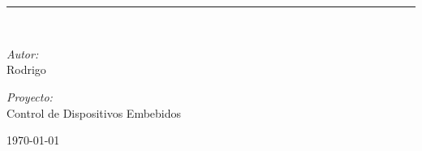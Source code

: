 \documentclass[
10pt, %
a4paper, %
oneside, %
headinclude,footinclude, %
BCOR5mm, %
]{scrartcl}
\begin{document}
\begin{titlepage}
	\centering
	\vspace*{2cm}
	
	
	\vspace{1cm}
	
	{\Huge\bfseries\color{Maroon}}\\[0.5cm]
	
	{\Large{}}\\[1.5cm]
	
	\rule{\linewidth}{1pt}\\[2cm]
	
	\begin{minipage}{0.45\textwidth}
		\begin{flushleft} \large
			\emph{Autor:}\\
			Rodrigo 
		\end{flushleft}
	\end{minipage}
	\hfill
	\begin{minipage}{0.45\textwidth}
		\begin{flushright} \large
			\emph{Proyecto:}\\
			Control de Dispositivos Embebidos
		\end{flushright}
	\end{minipage}
	
	\vfill
	\vspace{3cm}
	
	{\large\today}\\[1cm]
\end{titlepage}
\newpage %
\end{document}
